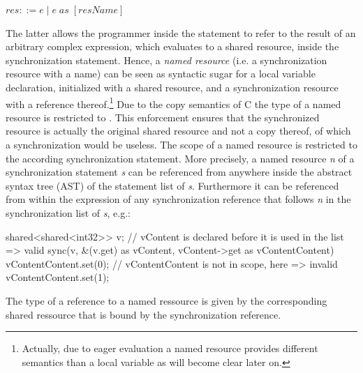 $ res ::= e\;|\;e\;\mathit{as}\;[\mathit{resName}] $

The latter allows the programmer inside the  statement to refer to the result of an arbitrary complex expression, which evaluates to a shared resource, inside the synchronization statement. Hence, a \textit{named resource} (i.e. a synchronization resource with a name) can be seen as syntactic sugar for a local variable declaration, initialized with a shared resource, and a synchronization resource with a reference thereof.\footnote{Actually, due to eager evaluation a named resource provides different semantics than a local variable as will become clear later on.} Due to the copy semantics of C the type of a named resource  is restricted to . This enforcement ensures that the synchronized resource is actually the original shared resource and not a copy thereof, of which a synchronization would be useless. The scope of a named resource is restricted to the according synchronization statement. More precisely, a named resource \textit{n} of a synchronization statement \textit{s} can be referenced from anywhere inside the abstract syntax tree (AST) of the statement list of \textit{s}. Furthermore it can be referenced from within the expression of any synchronization reference that follows \textit{n} in the synchronization list of \textit{s}, e.g.:
\begin{ccode}
shared<shared<int32>> v;
// vContent is declared before it is used in the list => valid
sync(v, &(v.get) as vContent, vContent->get as vContentContent) {
  vContentContent.set(0);
}
// vContentContent is not in scope, here => invalid
vContentContent.set(1);
\end{ccode}

The type of a reference to a named ressource is given by the corresponding shared ressource that is bound by the  synchronization reference.

